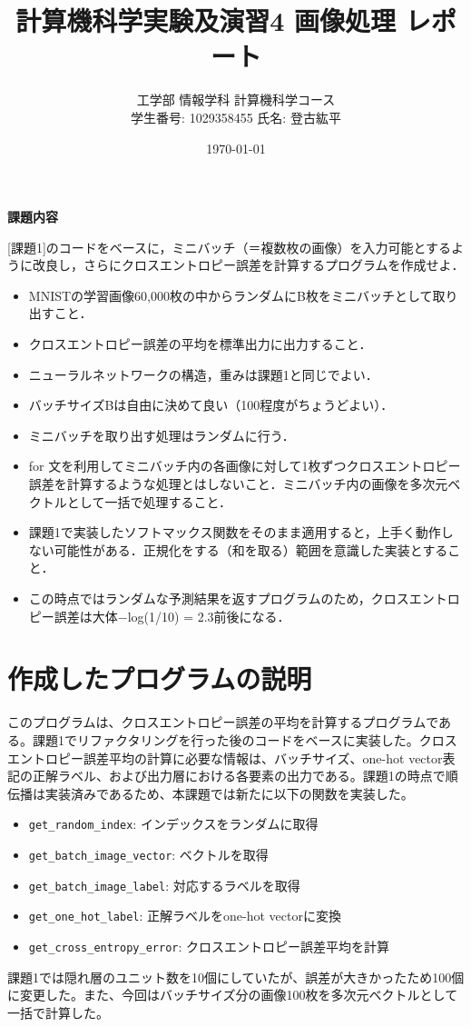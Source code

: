 \documentclass[11px,a4paper]{jsarticle}
\begin{document}
\title{計算機科学実験及演習4 画像処理 レポート}
\author{工学部 情報学科 計算機科学コース\\学生番号: 1029358455 \hspace{1em} 氏名: 登古紘平}
\date{\today}
\maketitle
\newpage

\begin{center}
\textbf{課題内容}
\end{center}
[課題1]のコードをベースに，ミニバッチ（＝複数枚の画像）を入力可能とするように改良し，さらにクロスエントロピー誤差を計算するプログラムを作成せよ．
\begin{itemize}
\item MNISTの学習画像60,000枚の中からランダムにB枚をミニバッチとして取り出すこと．
\item クロスエントロピー誤差の平均を標準出力に出力すること．
\item ニューラルネットワークの構造，重みは課題1と同じでよい．
\item バッチサイズBは自由に決めて良い（100程度がちょうどよい）．
\item ミニバッチを取り出す処理はランダムに行う．
\item for 文を利用してミニバッチ内の各画像に対して1枚ずつクロスエントロピー誤差を計算するような処理とはしないこと．ミニバッチ内の画像を多次元ベクトルとして一括で処理すること．
\item 課題1で実装したソフトマックス関数をそのまま適用すると，上手く動作しない可能性がある．正規化をする（和を取る）範囲を意識した実装とすること．
\item この時点ではランダムな予測結果を返すプログラムのため，クロスエントロピー誤差は大体−log(1/10) = 2.3前後になる．\\
\end{itemize}

\section{作成したプログラムの説明}
このプログラムは、クロスエントロピー誤差の平均を計算するプログラムである。課題1でリファクタリングを行った後のコードをベースに実装した。クロスエントロピー誤差平均の計算に必要な情報は、バッチサイズ、one-hot vector表記の正解ラベル、および出力層における各要素の出力である。課題1の時点で順伝播は実装済みであるため、本課題では新たに以下の関数を実装した。
\begin{itemize}
    \item \verb|get_random_index|: インデックスをランダムに取得
    \item \verb|get_batch_image_vector|: ベクトルを取得
    \item \verb|get_batch_image_label|: 対応するラベルを取得
    \item \verb|get_one_hot_label|: 正解ラベルをone-hot vectorに変換
    \item \verb|get_cross_entropy_error|: クロスエントロピー誤差平均を計算
\end{itemize}
課題1では隠れ層のユニット数を10個にしていたが、誤差が大きかったため100個に変更した。また、今回はバッチサイズ分の画像100枚を多次元ベクトルとして一括で計算した。
\end{document}
